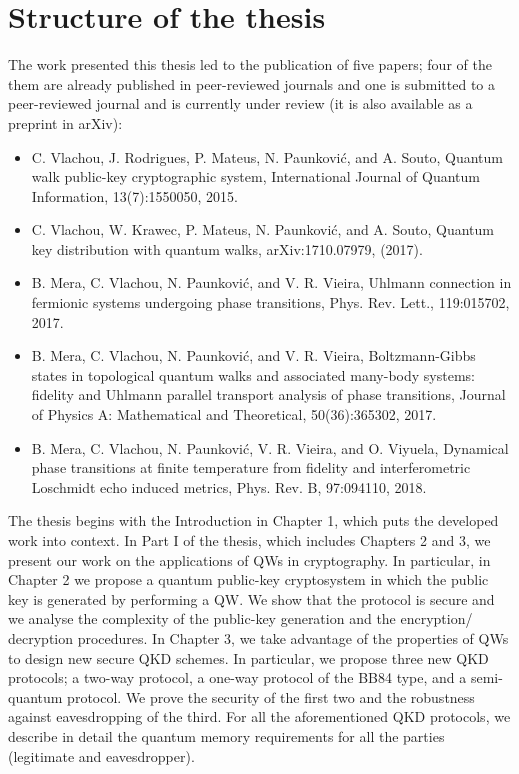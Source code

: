 \section{Structure of the thesis}
The work presented this thesis led to the publication of five papers; four of the them are already published in peer-reviewed journals and one is submitted to a peer-reviewed journal and is currently under review (it is also available as a preprint in arXiv):
\begin{itemize}
	\item C. Vlachou, J. Rodrigues, P. Mateus, N. Paunkovi\'c, and A. Souto, Quantum walk public-key cryptographic system, International Journal of Quantum Information, 13(7):1550050, 2015. 
	\item C. Vlachou, W. Krawec, P. Mateus, N. Paunkovi\'c, and A. Souto, Quantum key distribution with quantum walks, arXiv:1710.07979, (2017).
		\item B. Mera, C. Vlachou, N. Paunkovi\'c, and V. R. Vieira, Uhlmann connection in fermionic systems undergoing phase transitions, Phys. Rev. Lett., 119:015702, 2017.
		\item B. Mera, C. Vlachou, N. Paunkovi\'c, and V. R. Vieira, Boltzmann-Gibbs states in topological quantum walks and associated many-body systems: fidelity and Uhlmann parallel transport analysis of phase transitions, Journal of Physics A: Mathematical and Theoretical, 50(36):365302, 2017.
	\item B. Mera, C. Vlachou, N. Paunkovi\'c, V. R. Vieira, and O. Viyuela, Dynamical phase transitions at finite temperature from fidelity and interferometric Loschmidt echo induced metrics, Phys. Rev. B, 97:094110, 2018.
\end{itemize}

The thesis begins with the Introduction in Chapter 1, which puts the developed work into context.
In Part I of the thesis, which includes Chapters 2 and 3, we present our work on the applications of QWs in cryptography. In particular, in Chapter 2 we propose a quantum public-key cryptosystem in which the public key is generated by performing a QW. We show that the protocol is secure and we analyse the complexity of the public-key generation and the encryption/ decryption procedures.
In Chapter 3, we take advantage of the properties of QWs to design new secure QKD schemes. In particular, we propose three new QKD protocols; a two-way protocol, a one-way protocol of the BB84 type, and a semi-quantum protocol. We prove the security of the first two and the robustness against eavesdropping of the third. For all the aforementioned QKD protocols, we describe in detail the quantum memory requirements for all the parties (legitimate and eavesdropper).

